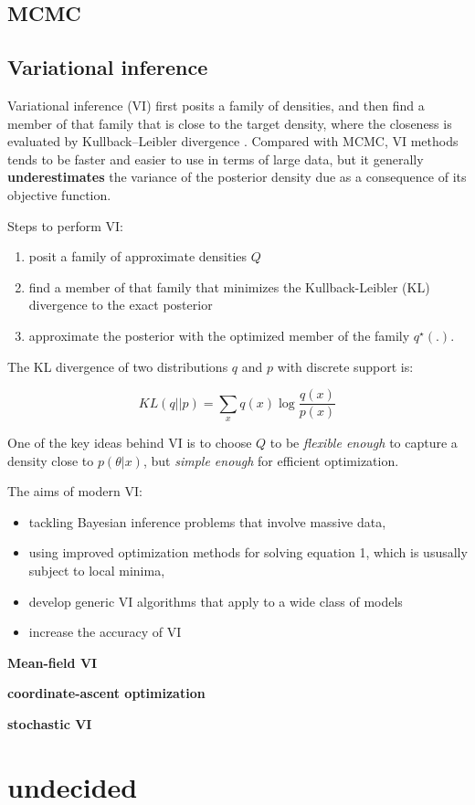 \documentclass[fontset=fandol,zihao=false,scheme=chinese,heading=true,UTF8]{ctexbook}
\providecommand{\tightlist}{%
  \setlength{\itemsep}{0pt}\setlength{\parskip}{0pt}}
\begin{document}
\hypertarget{mcmc}{%
\section{MCMC}\label{mcmc}}

\hypertarget{variational-inference}{%
\section{Variational inference}\label{variational-inference}}

Variational inference (VI) first posits a family of densities, and then find a member of that family that is close to the target density, where the closeness is evaluated by Kullback--Leibler divergence \citep{blei2017variational}. Compared with MCMC, VI methods tends to be faster and easier to use in terms of large data, but it generally \textbf{underestimates} the variance of the posterior density due as a consequence of its objective function.

Steps to perform VI:

\begin{enumerate}
\def\labelenumi{\arabic{enumi}.}
\tightlist
\item
  posit a family of approximate densities \(Q\)
\item
  find a member of that family that minimizes the Kullback-Leibler (KL) divergence to the exact posterior
\item
  approximate the posterior with the optimized member of the family \(q^{\star}(.)\).
\end{enumerate}

The KL divergence of two distributions \(q\) and \(p\) with discrete support is:

\[KL(q||p) = \sum_xq(x)\log \frac{q(x)}{p(x)}\]

One of the key ideas behind VI is to choose \(Q\) to be \emph{flexible enough} to capture a density close to \(p(\theta|x)\), but \emph{simple enough} for efficient optimization.

The aims of modern VI:

\begin{itemize}
\tightlist
\item
  tackling Bayesian inference problems that involve massive data,
\item
  using improved optimization methods for solving equation 1, which is ususally subject to local minima,
\item
  develop generic VI algorithms that apply to a wide class of models
\item
  increase the accuracy of VI
\end{itemize}

\textbf{Mean-field VI}

\textbf{coordinate-ascent optimization}

\textbf{stochastic VI}

\hypertarget{undecided}{%
\chapter{undecided}\label{undecided}}




\backmatter
\printindex
\end{document}
